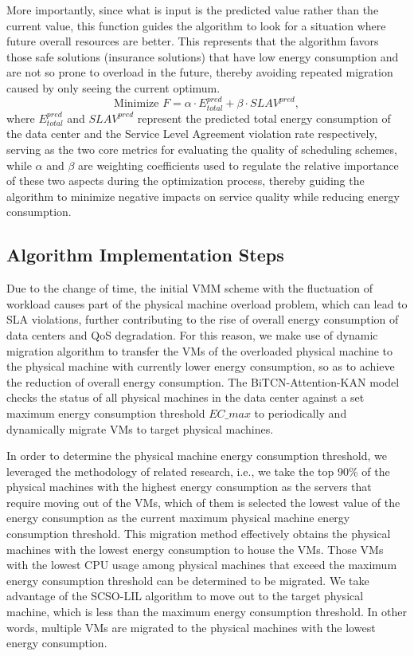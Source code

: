 \documentclass[conference]{{IEEEtran}}
\begin{document}
More importantly, since what is input is the predicted value rather than the current value, this function guides the algorithm to look for a situation where future overall resources are better\cite{hidayat2024machine}. This represents that the algorithm favors those safe solutions (insurance solutions) that have low energy consumption and are not so prone to overload in the future, thereby avoiding repeated migration caused by only seeing the current optimum.
\begin{equation}
    \text{Minimize } F = \alpha \cdot E_{total}^{pred} + \beta \cdot SLAV^{pred},
    \label{eq:fitness_function}
\end{equation}
where $E^{pred}_{total}$ and $SLAV^{pred}$ represent the predicted total energy consumption of the data center and the Service Level Agreement violation rate respectively, serving as the two core metrics for evaluating the quality of scheduling schemes, while $\alpha$ and $\beta$ are weighting coefficients used to regulate the relative importance of these two aspects during the optimization process, thereby guiding the algorithm to minimize negative impacts on service quality while reducing energy consumption.

\subsection{Algorithm Implementation Steps}

Due to the change of time, the initial VMM scheme with the fluctuation of workload causes part of the physical machine overload problem, which can lead to SLA violations, further contributing to the rise of overall energy consumption of data centers and QoS degradation. For this reason, we make use of dynamic migration algorithm to transfer the VMs of the overloaded physical machine to the physical machine with currently lower energy consumption, so as to achieve the reduction of overall energy consumption. The BiTCN-Attention-KAN model checks the status of all physical machines in the data center against a set maximum energy consumption threshold $EC\_{max}$ to periodically and dynamically migrate VMs to target physical machines.

In order to determine the physical machine energy consumption threshold, we leveraged the methodology of related research, i.e., we take the top 90\% of the physical machines with the highest energy consumption as the servers that require moving out of the VMs, which of them is selected the lowest value of the energy consumption as the current maximum physical machine energy consumption threshold. This migration method effectively obtains the physical machines with the lowest energy consumption to house the VMs. Those VMs with the lowest CPU usage among physical machines that exceed the maximum energy consumption threshold can be determined to be migrated. We take advantage of the SCSO-LIL algorithm to move out to the target physical machine, which is less than the maximum energy consumption threshold. In other words, multiple VMs are migrated to the physical machines with the lowest energy consumption.
\end{document}
